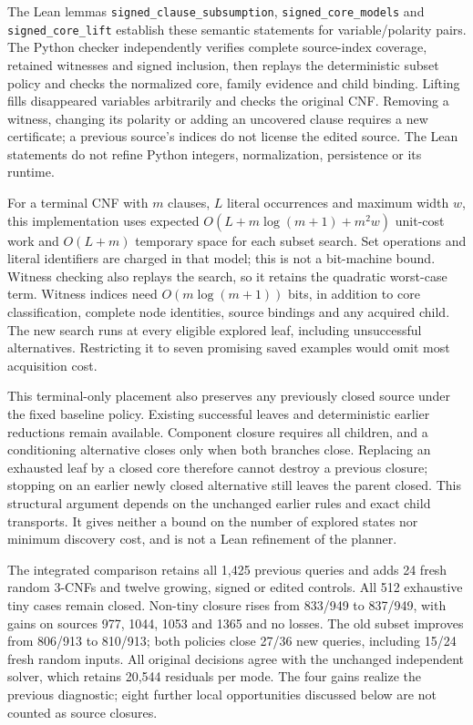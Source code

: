 \documentclass[11pt,a4paper]{article}
\numberwithin{equation}{section}
\theoremstyle{plain}
\theoremstyle{definition}
\theoremstyle{remark}
\begin{document}
The Lean lemmas \texttt{signed\_clause\_subsumption}, \texttt{signed\_core\_models} and \texttt{signed\_core\_lift} establish these semantic statements for variable/polarity pairs. The Python checker independently verifies complete source-index coverage, retained witnesses and signed inclusion, then replays the deterministic subset policy and checks the normalized core, family evidence and child binding. Lifting fills disappeared variables arbitrarily and checks the original CNF. Removing a witness, changing its polarity or adding an uncovered clause requires a new certificate; a previous source's indices do not license the edited source. The Lean statements do not refine Python integers, normalization, persistence or its runtime.

For a terminal CNF with $m$ clauses, $L$ literal occurrences and maximum width $w$, this implementation uses expected $O(L+m\log(m+1)+m^2w)$ unit-cost work and $O(L+m)$ temporary space for each subset search. Set operations and literal identifiers are charged in that model; this is not a bit-machine bound. Witness checking also replays the search, so it retains the quadratic worst-case term. Witness indices need $O(m\log(m+1))$ bits, in addition to core classification, complete node identities, source bindings and any acquired child. The new search runs at every eligible explored leaf, including unsuccessful alternatives. Restricting it to seven promising saved examples would omit most acquisition cost.

This terminal-only placement also preserves any previously closed source under the fixed baseline policy. Existing successful leaves and deterministic earlier reductions remain available. Component closure requires all children, and a conditioning alternative closes only when both branches close. Replacing an exhausted leaf by a closed core therefore cannot destroy a previous closure; stopping on an earlier newly closed alternative still leaves the parent closed. This structural argument depends on the unchanged earlier rules and exact child transports. It gives neither a bound on the number of explored states nor minimum discovery cost, and is not a Lean refinement of the planner.

The integrated comparison retains all 1,425 previous queries and adds 24 fresh random 3-CNFs and twelve growing, signed or edited controls. All 512 exhaustive tiny cases remain closed. Non-tiny closure rises from 833/949 to 837/949, with gains on sources 977, 1044, 1053 and 1365 and no losses. The old subset improves from 806/913 to 810/913; both policies close 27/36 new queries, including 15/24 fresh random inputs. All original decisions agree with the unchanged independent solver, which retains 20,544 residuals per mode. The four gains realize the previous diagnostic; eight further local opportunities discussed below are not counted as source closures.
\end{document}
